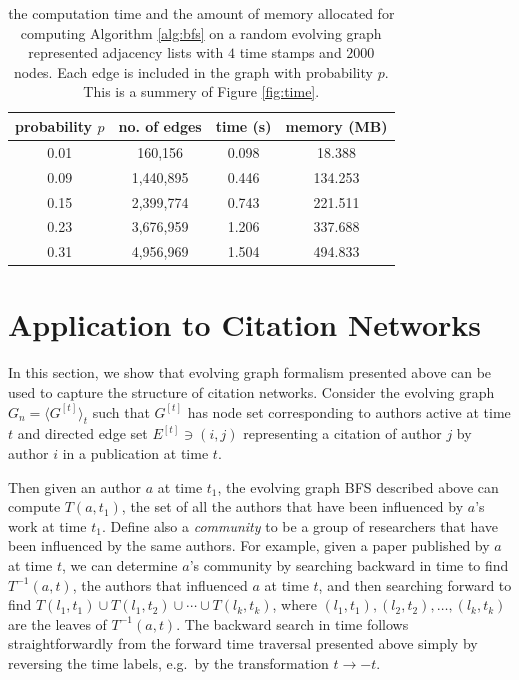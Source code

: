 \documentclass[10pt,conference,compsocconf]{IEEEtran}
\theoremstyle{definition}
\begin{document}
\begin{table}[h]
\centering
\begin{tabular}{c | c | c | c }
\hline
probability $p$ & no. of edges  & time (s) &  memory (MB) \\\hline
      0.01  &         160,156      & 0.098   & 18.388  \\
      0.09  &       1,440,895        & 0.446  &  134.253  \\
      0.15   &     2,399,774         & 0.743 & 221.511 \\
      0.23   &    3,676,959          & 1.206 &   337.688 \\
      0.31   &     4,956,969          & 1.504  &  494.833 \\
\end{tabular}
\caption{the computation time and the amount of memory allocated for 
computing Algorithm \ref{alg:bfs} on a random evolving graph represented 
adjacency lists with $4$ time stamps and $2000$ nodes.  
Each edge is included in the graph with probability $p$. 
This is a summery of Figure \ref{fig:time}.}
\label{tab:bfs}
\end{table}

\section{Application to Citation Networks}
\label{sec:applications}

In this section, we show that evolving graph formalism presented above can be
used to capture the structure of citation networks. Consider
the evolving graph $G_n=\langle G^{[t]} \rangle_t$ such that $G^{[t]}$ has
node set corresponding to authors active at time $t$ and directed edge set
$E^{[t]} \ni (i, j)$ representing a citation of author $j$ by author $i$ in a
publication at time $t$.

Then given an author $a$ at time $t_1$, the evolving graph BFS described above
can compute $T(a, t_1)$, the set of all the authors that have been influenced by
$a$'s work at time $t_1$.
Define also a \emph{community} to be a group of
researchers that have been influenced by the same authors.
For example, given a paper published by $a$ at time $t$,
we can determine $a$'s community by searching backward in time to find
$T^{-1}(a, t)$, the authors that influenced $a$ at time $t$, and then searching
forward to find $T(l_1, t_1) \cup T(l_1, t_2) \cup \cdots \cup T(l_k, t_k)$, where
$(l_1,t_1), (l_2, t_2), \ldots, (l_k, t_k)$ are the leaves of $T^{-1}(a,t)$.
The backward search in time follows straightforwardly from the forward time traversal
presented above simply by reversing the time labels, e.g.\ by the transformation
$t\rightarrow -t$.
\end{document}
